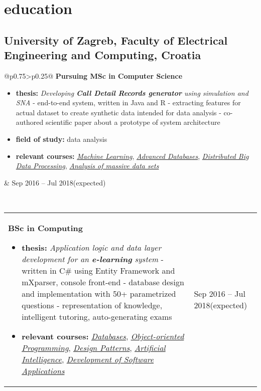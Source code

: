 \documentclass[a4paper]{article}
\makeatletter
\newlength{\tablewidth}
\newenvironment{period}[2]{%
\newcommand{\sarma}{#2}%
\setlength{\tablewidth}{\linewidth}
\addtolength{\tablewidth}{-2\tabcolsep}
\begin{tabular}{@{}p{0.75\tablewidth}>{\raggedleft\arraybackslash}p{0.25\tablewidth}@{}}%
#1 \newline
\begin{itemize}
}{%
\end{itemize} & \sarma \\%
\end{tabular}\\
}
\makeatother
\begin{document}
\section{education}
\subsection{University of Zagreb, Faculty of Electrical Engineering and Computing, Croatia}
\begin{period}{\textbf{Pursuing MSc in Computer Science}}{Sep 2016 -- Jul 2018\linebreak(expected)}
    \item \textbf{thesis:}
        \textit{Developing \textbf{Call Detail Records generator} using simulation and SNA}
        \newline - end-to-end system, written in Java and R
        \newline - extracting features for actual dataset to create synthetic data intended for data analysis
        \newline - co-authored scientific paper about a prototype of system architecture
    \item \textbf{field of study:}
        data analysis
    \item \textbf{relevant courses:}
	    \textit{\href{%
	    	}{Machine Learning}},
	    \textit{\href{%
	    	}{Advanced Databases}},
	    \textit{\href{%
	    	}{Distributed Big Data Processing}},
	    \textit{\href{%
	    	}{Analysis of massive data sets}}
\end{period}
\begin{period}{\textbf{BSc in Computing}}{Sep 2013 -- Jul 2016}
    \item \textbf{thesis:}
        \textit{Application logic and data layer development for an \textbf{e-learning} system}
        \newline - written in C\# using Entity Framework and mXparser, console front-end 
        \newline - database design and implementation with 50+ parametrized questions
        \newline - representation of knowledge, intelligent tutoring, auto-generating exams
        
    \item \textbf{relevant courses:}
	    \textit{\href{%
	    		}{Databases}},
		\textit{\href{%
				}{Object-oriented Programming}},
		\textit{\href{%
			}{Design Patterns}},
		\textit{\href{%
				}{Artificial Intelligence}},
		\textit{\href{%
				}{Development of Software Applications}}
		
\end{period}
\end{document}

